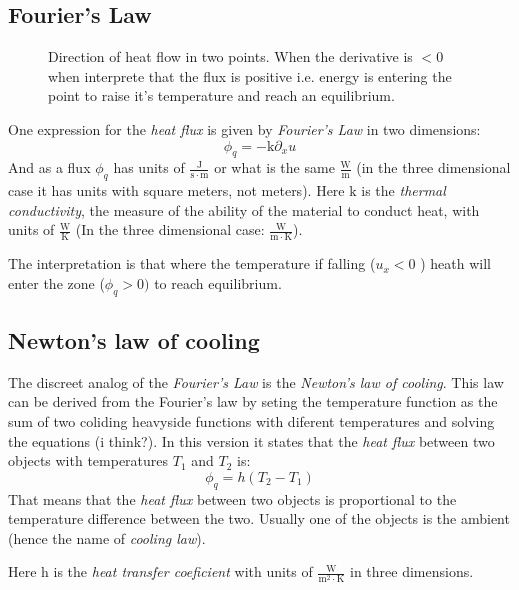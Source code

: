 \documentclass[../pde.tex]{subfiles}
\begin{document}
    \subsection{\sffamily Fourier's Law}
     \begin{figure}[ht]
        \centering
        \caption{Direction of heat flow in two points. When the derivative is $<0$ when interprete that the flux is positive i.e.
        energy is entering the point to raise it's temperature and reach an equilibrium.}
        \label{fig:heat-flow}
    \end{figure}
    
    One expression for the \emph{heat flux} is given by \emph{Fourier's Law} in two dimensions:
    \begin{equation}\label{furier-law}
        \phi_{q} = -\mathrm{k} \partial_{x} u
    \end{equation}
    And as a flux $\phi _{q}$ has units of $\mathrm{\frac{J}{s \cdot m}}$ or what is the same $\mathrm{\frac{W}{m}}$ (in the three
    dimensional case it has units with square meters, not meters). Here $\mathrm{k}$ is the \emph{thermal conductivity}, the measure
    of the ability of the material to conduct heat, with units of $\mathrm{\frac{W}{K}}$ (In the three dimensional case:
    $\mathrm{\frac{W}{m\cdot K}}$).
    
    The interpretation is that where the temperature if falling ($u_{x}<0$ ) heath will enter the zone ($\phi_{q} > 0)$  to reach 
    equilibrium.

   
    
    \subsection{\sffamily Newton's law of cooling}
    The discreet analog of the \emph{Fourier's Law}  is the \emph{Newton's law of cooling}. This law can be derived from the
    Fourier's law by seting the temperature function as the sum of two coliding heavyside functions with diferent temperatures and
    solving the equations (i think?). In this version it states that the \emph{heat flux} between two objects with temperatures
    $T_{1}$ and $T_{2}$ is:
    \begin{equation}\label{newton-cooling}
        \phi_{q} = h(T_{2}-T_{1})
    \end{equation}
    That means that the \emph{heat flux}  between two objects is proportional to the temperature difference between the two.
    Usually one of the objects is the ambient (hence the name of \emph{cooling law}).

    Here $\mathrm{h} $ is the \emph{heat transfer coeficient} with units of $\mathrm{\frac{W}{m^2 \cdot K}} $ in three dimensions.
    
    
    
\end{document}
